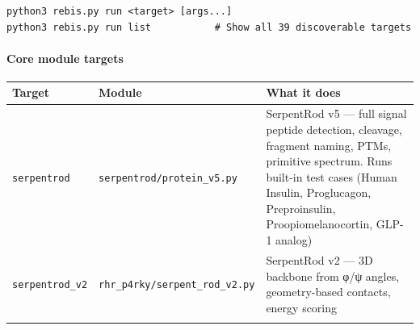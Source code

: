 \begin{verbatim}
python3 rebis.py run <target> [args...]
python3 rebis.py run list           # Show all 39 discoverable targets
\end{verbatim}

\hypertarget{core-module-targets}{%
\paragraph{Core module targets}\label{core-module-targets}}

\begin{longtable}[]{@{}lll@{}}
\toprule
\begin{minipage}[b]{0.24\columnwidth}\raggedright
Target\strut
\end{minipage} & \begin{minipage}[b]{0.24\columnwidth}\raggedright
Module\strut
\end{minipage} & \begin{minipage}[b]{0.43\columnwidth}\raggedright
What it does\strut
\end{minipage}\tabularnewline
\midrule
\endhead
\begin{minipage}[t]{0.24\columnwidth}\raggedright
\texttt{serpentrod}\strut
\end{minipage} & \begin{minipage}[t]{0.24\columnwidth}\raggedright
\texttt{serpentrod/protein\_v5.py}\strut
\end{minipage} & \begin{minipage}[t]{0.43\columnwidth}\raggedright
SerpentRod v5 --- full signal peptide detection, cleavage, fragment
naming, PTMs, primitive spectrum. Runs built-in test cases (Human
Insulin, Proglucagon, Preproinsulin, Proopiomelanocortin, GLP-1
analog)\strut
\end{minipage}\tabularnewline
\begin{minipage}[t]{0.24\columnwidth}\raggedright
\texttt{serpentrod\_v2}\strut
\end{minipage} & \begin{minipage}[t]{0.24\columnwidth}\raggedright
\texttt{rhr\_p4rky/serpent\_rod\_v2.py}\strut
\end{minipage} & \begin{minipage}[t]{0.43\columnwidth}\raggedright
SerpentRod v2 --- 3D backbone from φ/ψ angles, geometry-based contacts,
energy scoring\strut
\end{minipage}\tabularnewline
\begin{minipage}[t]{0.24\columnwidth}\raggedright

\end{minipage}
\end{longtable}

